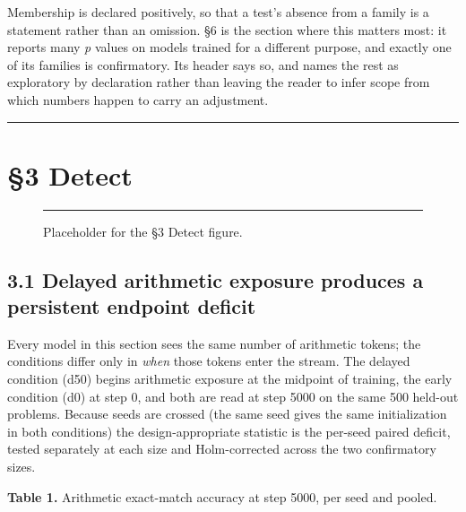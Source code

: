 \documentclass[11pt]{article}
\begin{document}
Membership is declared positively, so that a test's absence from a family is a statement
rather than an omission. §6 is the section where this matters most: it reports many \emph{p}
values on models trained for a different purpose, and exactly one of its families is
confirmatory. Its header says so, and names the rest as exploratory by declaration rather
than leaving the reader to infer scope from which numbers happen to carry an adjustment.

\begin{center}\rule{0.5\linewidth}{0.5pt}\end{center}

\section{§3 Detect}\label{detect}

\begin{figure}[t]
\centering
\rule{\linewidth}{11.55\baselineskip}
\caption{Placeholder for the §3 Detect figure.}
\end{figure}

\subsection{3.1 Delayed arithmetic exposure produces a persistent endpoint deficit}\label{delayed-arithmetic-exposure-produces-a-persistent-endpoint-deficit}

Every model in this section sees the same number of arithmetic tokens; the conditions
differ only in \emph{when} those tokens enter the stream. The delayed condition (d50) begins
arithmetic exposure at the midpoint of training, the early condition (d0) at step 0, and
both are read at step 5000 on the same 500 held-out problems. Because seeds are crossed (the same seed gives the same initialization in both conditions) the design-appropriate
statistic is the per-seed paired deficit, tested separately at each size and Holm-corrected
across the two confirmatory sizes.

\textbf{Table 1.} Arithmetic exact-match accuracy at step 5000, per seed and pooled.
\end{document}
